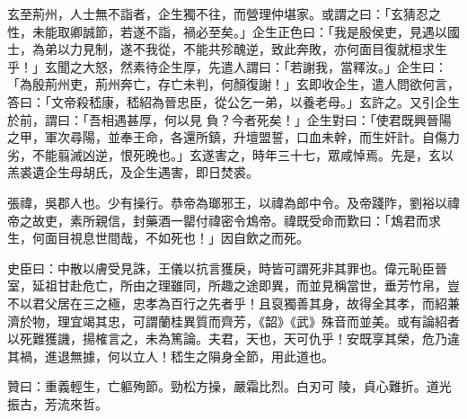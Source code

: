 \begin{pinyinscope}
 玄至荊州，人士無不詣者，企生獨不往，而營理仲堪家。或謂之曰：「玄猜忍之性，未能取卿誠節，若遂不詣，禍必至矣。」企生正色曰：「我是殷侯吏，見遇以國士，為弟以力見制，遂不我從，不能共殄醜逆，致此奔敗，亦何面目復就桓求生乎！」玄聞之大怒，然素待企生厚，先遣人謂曰：「若謝我，當釋汝。」企生曰：「為殷荊州吏，荊州奔亡，存亡未判，何顏復謝！」玄即收企生，遣人問欲何言，答曰：「文帝殺嵇康，嵇紹為晉忠臣，從公乞一弟，以養老母。」玄許之。又引企生於前，謂曰：「吾相遇甚厚，何以見
 負？今者死矣！」企生對曰：「使君既興晉陽之甲，軍次尋陽，並奉王命，各還所鎮，升壇盟誓，口血未幹，而生奸計。自傷力劣，不能翦滅凶逆，恨死晚也。」玄遂害之，時年三十七，眾咸悼焉。先是，玄以羔裘遺企生母胡氏，及企生遇害，即日焚裘。



 張禕，吳郡人也。少有操行。恭帝為瑯邪王，以禕為郎中令。及帝踐阼，劉裕以禕帝之故吏，素所親信，封藥酒一罌付禕密令鴆帝。禕既受命而歎曰：「鴆君而求生，何面目視息世間哉，不如死也！」因自飲之而死。



 史臣曰：中散以膚受見誅，王儀以抗言獲戾，時皆可謂死非其罪也。偉元恥臣晉室，延祖甘赴危亡，所由之理雖同，所趣之途即異，而並見稱當世，垂芳竹帛，豈不以君父居在三之極，忠孝為百行之先者乎！且裒獨善其身，故得全其孝，而紹兼濟於物，理宜竭其忠，可謂蘭桂異質而齊芳，《韶》《武》殊音而並美。或有論紹者以死難獲譏，揚榷言之，未為篤論。夫君，天也，天可仇乎！安既享其榮，危乃違其禍，進退無據，何以立人！嵇生之隕身全節，用此道也。



 贊曰：重義輕生，亡軀殉節。勁松方操，嚴霜比烈。白刃可
 陵，貞心難折。道光振古，芳流來哲。



\end{pinyinscope}